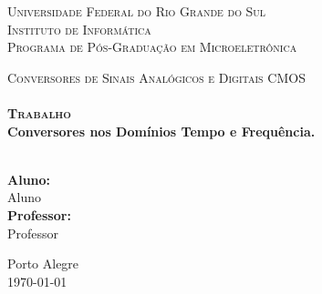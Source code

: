 \begin{titlepage}
\begin{center}

\textsc{\Large Universidade Federal do Rio Grande do Sul}\\
\textsc{\Large Instituto de Informática}\\
\textsc{\Large Programa de Pós-Graduação em Microeletrônica}\\
\vspace{3.5cm}

\textsc{\Large Conversores de Sinais Analógicos e Digitais CMOS}\\[3cm]

\HRule \\[0.5cm]

{\Large\bfseries\textsc{\Large Trabalho}\\}
{\Large \bfseries Conversores nos Domínios Tempo e Frequência. \\[0.5cm]}

\HRule \\[3cm]

\large\textbf{Aluno:}\\
Aluno \\[1cm]

\large\textbf{Professor:}\\
Professor\\[1cm]

\vfill

\large{Porto Alegre}\\
{\large \today}

\end{center}
\end{titlepage}